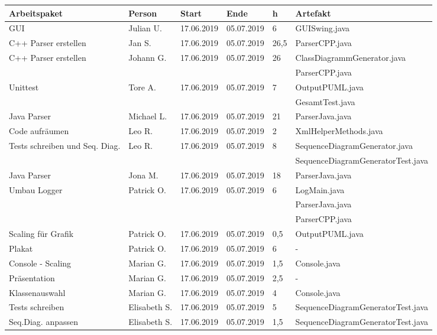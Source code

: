 \begin{longtable}{|p{4cm}|l|l|l|l|l|}
	\hline
	Arbeitspaket & Person & Start & Ende & h & Artefakt\\
	\hline	
	
	GUI  & Julian U.  & 17.06.2019 & 05.07.2019 & 6 & GUISwing.java \\ \hline
	C++ Parser erstellen & Jan S. & 17.06.2019 & 05.07.2019 & 26,5 & ParserCPP.java \\ \hline
	C++ Parser erstellen & Johann G.   & 17.06.2019 & 05.07.2019 & 26 & ClassDiagrammGenerator.java \\  & & & & & ParserCPP.java \\ \hline
	Unittest & Tore A.   & 17.06.2019 & 05.07.2019 &7 & OutputPUML.java \\ & & & & & GesamtTest.java  \\ \hline
    Java Parser  & Michael L.   & 17.06.2019 & 05.07.2019 & 21 & ParserJava.java \\ \hline
	Code aufräumen & Leo R.   & 17.06.2019 & 05.07.2019 & 2 & XmlHelperMethods.java \\ \hline
	Tests schreiben und Seq. Diag. & Leo R.   & 17.06.2019 & 05.07.2019 & 8 & SequenceDiagramGenerator.java \\ & & & & & SequenceDiagramGeneratorTest.java \\ \hline
	Java Parser & Jona M.   & 17.06.2019 & 05.07.2019 & 18 & ParserJava.java \\ \hline
	Umbau Logger & Patrick O.   & 17.06.2019 & 05.07.2019 & 6  & LogMain.java \\  & & & & & ParserJava.java \\& & & & & ParserCPP.java \\  \hline
	Scaling für Grafik & Patrick O.   & 17.06.2019 & 05.07.2019 & 0,5 & OutputPUML.java \\  \hline
	Plakat & Patrick O.   & 17.06.2019 & 05.07.2019 & 6 & - \\  \hline
	Console - Scaling & Marian G.  & 17.06.2019 & 05.07.2019 & 1,5 & Console.java\\ \hline
	Präsentation & Marian G.  & 17.06.2019 & 05.07.2019 & 2,5 & - \\ \hline
	Klassenauswahl & Marian G.  & 17.06.2019 & 05.07.2019 & 4 & Console.java \\ \hline
	Tests schreiben  & Elisabeth S.  & 17.06.2019 & 05.07.2019  & 5 & SequenceDiagramGeneratorTest.java \\ \hline
	Seq.Diag. anpassen  & Elisabeth S.  & 17.06.2019 & 05.07.2019  & 1,5 & SequenceDiagramGeneratorTest.java \\ \hline

\end{longtable}     

